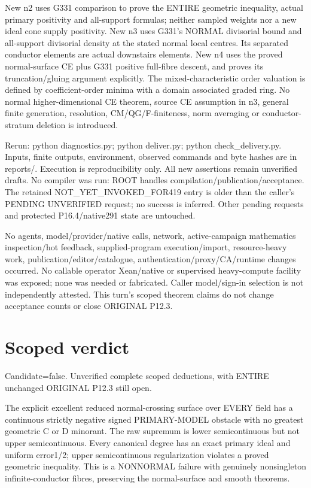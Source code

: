 \documentclass[11pt]{article}
\begin{document}
New n2 uses G331 comparison to prove the ENTIRE geometric inequality, actual primary positivity and all-support formulas; neither sampled weights nor a new ideal cone supply positivity. New n3 uses G331's NORMAL divisorial bound and all-support divisorial density at the stated normal local centres. Its separated conductor elements are actual downstairs elements. New n4 uses the proved normal-surface CE plus G331 positive full-fibre descent, and proves its truncation/gluing argument explicitly. The mixed-characteristic order valuation is defined by coefficient-order minima with a domain associated graded ring. No normal higher-dimensional CE theorem, source CE assumption in n3, general finite generation, resolution, CM/QG/F-finiteness, norm averaging or conductor-stratum deletion is introduced.

Rerun: python diagnostics.py; python deliver.py; python check\_delivery.py. Inputs, finite outputs, environment, observed commands and byte hashes are in reports/. Execution is reproducibility only. All new assertions remain unverified drafts. No compiler was run: ROOT handles compilation/publication/acceptance. The retained NOT\_YET\_INVOKED\_FOR419 entry is older than the caller's PENDING UNVERIFIED request; no success is inferred. Other pending requests and protected P16.4/native291 state are untouched.

No agents, model/provider/native calls, network, active-campaign mathematics inspection/hot feedback, supplied-program execution/import, resource-heavy work, publication/editor/catalogue, authentication/proxy/CA/runtime changes occurred. No callable operator Xean/native or supervised heavy-compute facility was exposed; none was needed or fabricated. Caller model/sign-in selection is not independently attested. This turn's scoped theorem claims do not change acceptance counts or close ORIGINAL P12.3.

\section*{Scoped verdict}
Candidate=false. Unverified complete scoped deductions, with ENTIRE unchanged ORIGINAL P12.3 still open.

The explicit excellent reduced normal-crossing surface over EVERY field has a continuous strictly negative signed PRIMARY-MODEL obstacle with no greatest geometric C or D minorant. The raw supremum is lower semicontinuous but not upper semicontinuous. Every canonical degree has an exact primary ideal and uniform error1/2; upper semicontinuous regularization violates a proved geometric inequality. This is a NONNORMAL failure with genuinely nonsingleton infinite-conductor fibres, preserving the normal-surface and smooth theorems.
\end{document}
